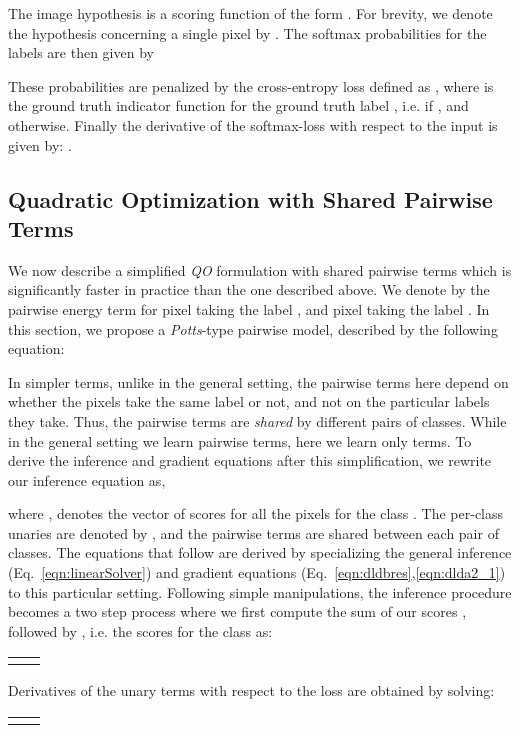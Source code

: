 \documentclass[runningheads]{llncs}
\begin{document}
The image hypothesis is a scoring function of the form . For brevity, we denote the hypothesis concerning a single pixel by .
The softmax probabilities for the labels are then given by 

These probabilities are penalized by the cross-entropy loss
defined as
, 
where  is the ground truth indicator function for the ground truth label , i.e.  if , and  otherwise.
Finally the derivative of the softmax-loss with respect to the input is given by:
.


\subsection{Quadratic Optimization with Shared Pairwise Terms}
\label{sec:simpleqo}
We now describe a simplified \emph{QO} formulation with shared pairwise terms which is significantly faster in practice than the one described above.
We denote by  the pairwise energy term for pixel  taking the label , and pixel  taking the label .
In this section, we propose a \emph{Potts}-type pairwise model, described by the following equation:


In simpler terms, unlike in the general setting, the pairwise terms here depend on whether the pixels take the same label or not, and not on the particular labels they take.
Thus, the pairwise terms are \emph{shared} by different pairs of classes. 
While in the general setting we learn  pairwise terms, here we learn only  terms. To derive the inference and gradient equations after this simplification,
we rewrite our inference equation  as,


where , denotes the vector of scores for all the pixels for the class . The per-class unaries are denoted by , and the pairwise terms  are 
shared between each pair of classes. The equations that follow are derived by specializing the general inference (Eq.~\ref{eqn:linearSolver}) and gradient equations (Eq.~\ref{eqn:dldbres},\ref{eqn:dlda2_1}) to this particular setting.
Following simple manipulations, the inference procedure becomes a two step process where we first compute the sum of our 
scores , followed by , i.e. the scores for the class  as:

\noindent\begin{tabularx}{\textwidth}{@{}XX@{}}
 &
 
\end{tabularx}

Derivatives of the unary terms with respect to the loss are obtained by solving:

\noindent\begin{tabularx}{\textwidth}{@{}XX@{}}
 &
 
\end{tabularx}
\end{document}
